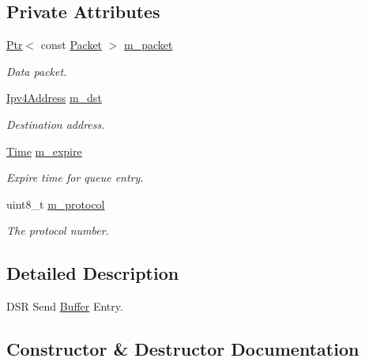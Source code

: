 \subsection*{Private Attributes}
\begin{DoxyCompactItemize}
\item 
\hyperlink{classns3_1_1Ptr}{Ptr}$<$ const \hyperlink{classns3_1_1Packet}{Packet} $>$ \hyperlink{classns3_1_1dsr_1_1DsrSendBuffEntry_a2e375746029ba88a98d331f23307f7f2}{m\+\_\+packet}
\begin{DoxyCompactList}\small\item\em Data packet. \end{DoxyCompactList}\item 
\hyperlink{classns3_1_1Ipv4Address}{Ipv4\+Address} \hyperlink{classns3_1_1dsr_1_1DsrSendBuffEntry_a2b36d0bcffbe657d1a302c95c687895b}{m\+\_\+dst}
\begin{DoxyCompactList}\small\item\em Destination address. \end{DoxyCompactList}\item 
\hyperlink{classns3_1_1Time}{Time} \hyperlink{classns3_1_1dsr_1_1DsrSendBuffEntry_aabe31d1a945201779003637b7925d20b}{m\+\_\+expire}
\begin{DoxyCompactList}\small\item\em Expire time for queue entry. \end{DoxyCompactList}\item 
uint8\+\_\+t \hyperlink{classns3_1_1dsr_1_1DsrSendBuffEntry_a5a3fa0f68c51794cb1c35d2d038eb0c4}{m\+\_\+protocol}
\begin{DoxyCompactList}\small\item\em The protocol number. \end{DoxyCompactList}\end{DoxyCompactItemize}


\subsection{Detailed Description}
D\+SR Send \hyperlink{classns3_1_1Buffer}{Buffer} Entry. 

\subsection{Constructor \& Destructor Documentation}
